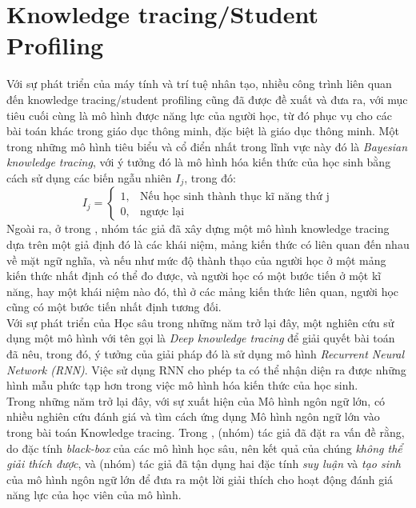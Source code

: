 \section{Knowledge tracing/Student Profiling}
Với sự phát triển của máy tính và trí tuệ nhân tạo, nhiều công trình liên quan đến knowledge tracing/student profiling cũng đã được đề xuất và đưa ra, với mục tiêu cuối cùng là mô hình được năng lực của người học, từ đó phục vụ cho các bài toán khác trong giáo dục thông minh, đặc biệt là giáo dục thông minh. Một trong những mô hình tiêu biểu và cổ điển nhất trong lĩnh vực này đó là \emph{Bayesian knowledge tracing}, với ý tưởng đó là mô hình hóa kiến thức của học sinh bằng cách sử dụng các biến ngẫu nhiên $I_j$, trong đó:
\begin{equation}
  I_{j} = \begin{cases}
    1, & \text{Nếu học sinh thành thục kĩ năng thứ j} \\
    0, & \text{ngược lại}
  \end{cases} \label{eq:indicator}
\end{equation}
 Ngoài ra, ở trong \cite{cross_modal_2021}, nhóm tác giả đã xây dựng một mô hình knowledge tracing dựa trên một giả định đó là các khái niệm, mảng kiến thức có liên quan đến nhau về mặt ngữ nghĩa, và nếu như mức độ thành thạo của người học ở một mảng kiến thức nhất định có thể đo được, và người học có một bước tiến ở một kĩ năng, hay một khái niệm nào đó, thì ở các mảng kiến thức liên quan, người học cũng có một bước tiến nhất định tương đối.\\
Với sự phát triển của Học sâu trong những năm trở lại đây, một nghiên cứu sử dụng một mô hình với tên gọi là \emph{Deep knowledge tracing} \cite{10.5555/2969239.2969296} để giải quyết bài toán đã nêu, trong đó, ý tưởng của giải pháp đó là sử dụng mô hình \emph{Recurrent Neural Network (RNN)}. Việc sử dụng RNN cho phép ta có thể nhận diện ra được những hình mẫu phức tạp hơn trong việc mô hình hóa kiến thức của học sinh.\\
Trong những năm trở lại đây, với sự xuất hiện của Mô hình ngôn ngữ lớn, có nhiều nghiên cứu đánh giá và tìm cách ứng dụng Mô hình ngôn ngữ lớn vào trong bài toán Knowledge tracing. Trong \cite{li2024explainable}, (nhóm) tác giả đã đặt ra vấn đề rằng, do đặc tính \emph{black-box} của các mô hình học sâu, nên kết quả của chúng \emph{không thể giải thích được}, và (nhóm) tác giả đã tận dụng hai đặc tính \emph{suy luận} và  \emph{tạo sinh} của mô hình ngôn ngữ lớn để đưa ra một lời giải thích cho hoạt động đánh giá năng lực của học viên của mô hình.

